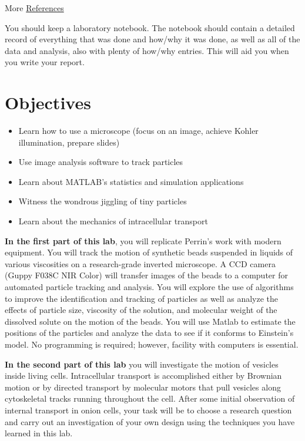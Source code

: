 \documentclass{../lab}
\begin{document}
 More \hyperref[sec:References]{References} 

You should keep a laboratory notebook. The notebook should contain a detailed record of everything that was done and how/why it was done, as well as all of the data and analysis, also with plenty of how/why entries. This will aid you when you write your report.

\section{Objectives}

\begin{itemize}
    \item Learn how to use a microscope (focus on an image, achieve Kohler illumination, prepare slides)

    \item Use image analysis software to track particles

    \item Learn about MATLAB's statistics and simulation applications

    \item Witness the wondrous jiggling of tiny particles

    \item Learn about the mechanics of intracellular transport
\end{itemize}

\textbf{In the first part of this lab}, you will replicate Perrin's work with modern equipment. You will track the motion of synthetic beads suspended in liquids of various viscosities on a research-grade inverted microscope. A CCD camera (Guppy F038C NIR Color) will transfer images of the beads to a computer for automated particle tracking and analysis. You will explore the use of algorithms to improve the identification and tracking of particles as well as analyze the effects of particle size, viscosity of the solution, and molecular weight of the dissolved solute on the motion of the beads. You will use Matlab to estimate the positions of the particles and analyze the data to see if it conforms to Einstein's model. No programming is required; however, facility with computers is essential.

\textbf{In the second part of this lab} you will investigate the motion of vesicles inside living cells. Intracellular transport is accomplished either by Brownian motion or by directed transport by molecular motors that pull vesicles along cytoskeletal tracks running throughout the cell. After some initial observation of internal transport in onion cells, your task will be to choose a research question and carry out an investigation of your own design using the techniques you have learned in this lab.
\end{document}
